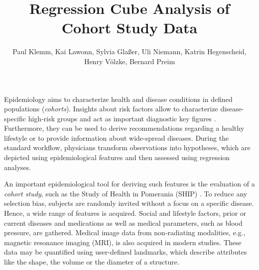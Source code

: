\documentclass[journal]{style/vgtc} 			          %
\title{Regression Cube Analysis of Cohort Study Data}
\author{Paul Klemm, Kai Lawonn, Sylvia Gla{\ss}er, Uli Niemann, Katrin Hegenscheid, Henry V{\"o}lzke, Bernard Preim}
\begin{document}


\maketitle
Epidemiology aims to characterize health and disease conditions in defined populations (\emph{cohorts}).
Insights about risk factors allow to characterize disease-specific high-risk groups and act as important diagnostic key figures \cite{Fletcher2012}.
Furthermore, they can be used to derive recommendations regarding a healthy lifestyle or to provide information about wide-spread diseases.
During the standard workflow, physicians transform observations into hypotheses, which are depicted using epidemiological features and then assessed using regression analyses.

An important epidemiological tool for deriving such features is the evaluation of a \emph{cohort study}, such as the Study of Health in Pomerania (SHIP) \cite{Volzke2011}.
To reduce any selection bias, subjects are randomly invited without a focus on a specific disease.
Hence, a wide range of features is acquired.
%
Social and lifestyle factors, prior or current diseases and medications as well as medical parameters, such as blood pressure, are gathered.
Medical image data from non-radiating modalities, e.g., magnetic resonance imaging (MRI), is also acquired in modern studies.
These data may be quantified using user-defined landmarks, which describe attributes like the shape, the volume or the diameter of a structure.
\end{document}

